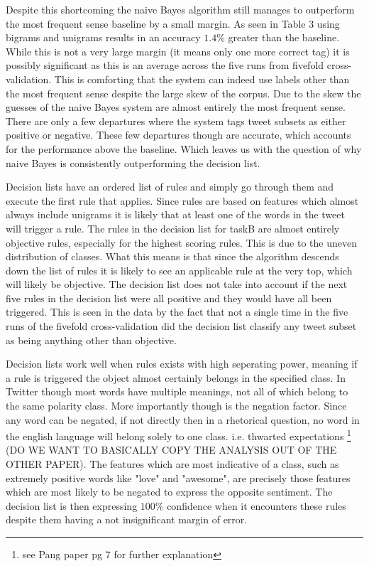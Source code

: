 \documentclass[11pt]{article}
\begin{document}
Despite this shortcoming the naive Bayes algorithm still manages to outperform the most frequent sense baseline by a small margin. As seen in Table 3 using bigrams and unigrams results in an accuracy $1.4\%$ greater than the baseline. While this is not a very large margin (it means only one more correct tag) it is possibly significant as this is an average across the five runs from fivefold cross-validation. This is comforting that the system can indeed use labels other than the most frequent sense despite the large skew of the corpus. Due to the skew the guesses of the naive Bayes system are almost entirely the most frequent sense. There are only a few departures where the system tags tweet subsets as either positive or negative. These few departures though are accurate, which accounts for the performance above the baseline. Which leaves us with the question of why naive Bayes is consistently outperforming the decision list.

Decision lists have an ordered list of rules and simply go through them and execute the first rule that applies. Since rules are based on features which almost always include unigrams it is likely that at least one of the words in the tweet will trigger a rule. The rules in the decision list for taskB are almost entirely objective rules, especially for the highest scoring rules. This is due to the uneven distribution of classes. What this means is that since the algorithm descends down the list of rules it is likely to see an applicable rule at the very top, which will likely be objective. The decision list does not take into account if the next five rules in the decision list were all positive and they would have all been triggered. This is seen in the data by the fact that not a single time in the five runs of the fivefold cross-validation did the decision list classify any tweet subset as being anything other than objective.

Decision lists work well when rules exists with high seperating power, meaning if a rule is triggered the object almost certainly belongs in the specified class. In Twitter though most words have multiple meanings, not all of which belong to the same polarity class. More importantly though is the negation factor. Since any word can be negated, if not directly then in a rhetorical question, no word in the english language will belong solely to one class. i.e. thwarted expectations \footnote{see Pang paper pg 7 for further explanation}  (DO WE WANT TO BASICALLY COPY THE ANALYSIS OUT OF THE OTHER PAPER). The features which are most indicative of a class, such as extremely positive words like "love" and "awesome", are precisely those features which are most likely to be negated to express the opposite sentiment. The decision list is then expressing $100\%$ confidence when it encounters these rules despite them having a not insignificant margin of error.
\end{document}

